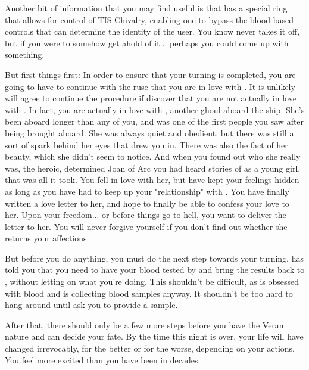 \documentclass[char]{guildcamp4}
\begin{document}
Another bit of information that you may find useful is that \cVone{} has a special ring that allows for control of TIS Chivalry, enabling one to bypass the blood-based controls that can determine the identity of the user. You know \cVone{} never takes it off, but if you were to somehow get ahold of it... perhaps you could come up with something.

But first things first: In order to ensure that your turning is completed, you are going to have to continue with the ruse that you are in love with \cVtwo{}. It is unlikely \cVtwo{\they} will agree to continue the procedure if \cVtwo{\they} discover that you are not actually in love with \cVtwo{\them}. In fact, you are actually in love with \cJoan{}, another ghoul aboard the ship. She's been aboard longer than any of you, and was one of the first people you saw after being brought aboard. She was always quiet and obedient, but there was still a sort of spark behind her eyes that drew you in. There was also the fact of her beauty, which she didn't seem to notice. And when you found out who she really was, the heroic, determined Joan of Arc you had heard stories of as a young girl, that was all it took. You fell in love with her, but have kept your feelings hidden as long as you have had to keep up your "relationship" with \cVtwo{}. You have finally written a love letter to her, and hope to finally be able to confess your love to her. Upon your freedom... or before things go to hell, you want to deliver the letter to her. You will never forgive yourself if you don't find out whether she returns your affections.

But before you do anything, you must do the next step towards your turning. \cVtwo{} has told you that you need to have your blood tested by \cVthree{} and bring the results back to \cVtwo{\them}, without letting on what you're doing. This shouldn't be difficult, as \cVthree{} is obsessed with blood and is collecting blood samples anyway. It shouldn't be too hard to hang around \cVthree{\them} until \cVthree{\they} ask you to provide a sample. 

After that, there should only be a few more steps before you have the Veran nature and can decide your fate. By the time this night is over, your life will have changed irrevocably, for the better or for the worse, depending on your actions. You feel more excited than you have been in decades.
\end{document}
